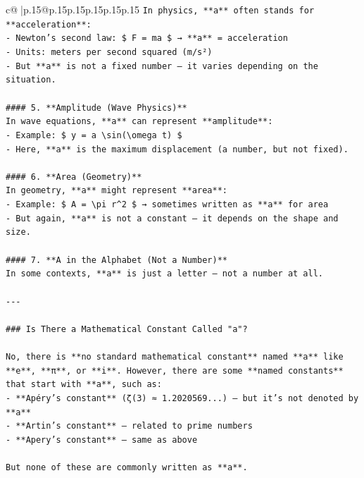 \documentclass{article}
\begin{document}
{\begin{supertabular}{c@{$\;$}|p{.15\linewidth}@{}p{.15\linewidth}p{.15\linewidth}p{.15\linewidth}p{.15\linewidth}p{.15\linewidth}}
{{{\texttt{In physics, **a** often stands for **acceleration**:} \\
\texttt{{-} Newton’s second law: \$ F = ma \$ → **a** = acceleration} \\
\texttt{{-} Units: meters per second squared (m/s²)} \\
\texttt{{-} But **a** is not a fixed number — it varies depending on the situation.} \\
\\ 
\texttt{\#\#\#\# 5. **Amplitude (Wave Physics)**} \\
\texttt{In wave equations, **a** can represent **amplitude**:} \\
\texttt{{-} Example: \$ y = a \textbackslash{}sin(\textbackslash{}omega t) \$} \\
\texttt{{-} Here, **a** is the maximum displacement (a number, but not fixed).} \\
\\ 
\texttt{\#\#\#\# 6. **Area (Geometry)**} \\
\texttt{In geometry, **a** might represent **area**:} \\
\texttt{{-} Example: \$ A = \textbackslash{}pi r\^{}2 \$ → sometimes written as **a** for area} \\
\texttt{{-} But again, **a** is not a constant — it depends on the shape and size.} \\
\\ 
\texttt{\#\#\#\# 7. **A in the Alphabet (Not a Number)**} \\
\texttt{In some contexts, **a** is just a letter — not a number at all.} \\
\\ 
\texttt{{-}{-}{-}} \\
\\ 
\texttt{\#\#\# Is There a Mathematical Constant Called "a"?} \\
\\ 
\texttt{No, there is **no standard mathematical constant** named **a** like **e**, **π**, or **i**. However, there are some **named constants** that start with **a**, such as:} \\
\texttt{{-} **Apéry's constant** (ζ(3) ≈ 1.2020569...) — but it's not denoted by **a**} \\
\texttt{{-} **Artin's constant** — related to prime numbers} \\
\texttt{{-} **Apery's constant** — same as above} \\
\\ 
\texttt{But none of these are commonly written as **a**.} \\
}}}
\end{supertabular}}
\end{document}

